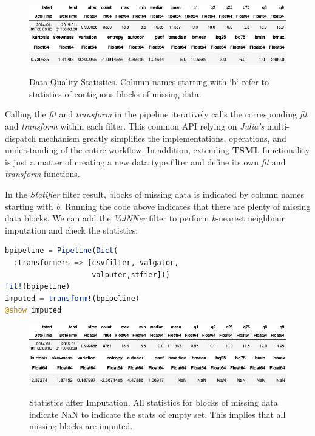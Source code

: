 \documentclass{juliacon}
\begin{document}
\begin{figure}[htbp]
   \centering
   \includegraphics[width=\columnwidth]{stat1.png} %
   \vskip 2pt
      \includegraphics[width=\columnwidth]{stat2.png} %
   \caption{Data Quality Statistics. Column names starting with `b` refer to statistics of contiguous blocks of missing data.}
   \label{fig:dataquality}
\end{figure}

Calling the \emph{fit} and \emph{transform} in the pipeline
iteratively calls the corresponding \emph{fit} and \emph{transform} within each filter. 
This common API relying on \emph{Julia's} multi-dispatch mechanism greatly simplifies the implementations, operations, 
and understanding of the entire workflow. In addition, extending \textbf{TSML} functionality is just a 
matter of creating a new data type filter and define its own  \emph{fit} and \emph{transform} 
functions.

\vskip 6pt

In the \emph{Statifier} filter result, blocks of missing data is indicated by column names starting
with \emph{b}. Running the code above indicates that there are plenty of missing data blocks.
We can add the \emph{ValNNer} filter to perform \emph{k}-nearest neighbour imputation and check
the statistics:

\begin{lstlisting}[language = Julia]
bpipeline = Pipeline(Dict(
  :transformers => [csvfilter, valgator, 
                    valputer,stfier]))
fit!(bpipeline)
imputed = transform!(bpipeline)
@show imputed
\end{lstlisting}

\begin{figure}[htbp]
   \centering
   \includegraphics[width=\columnwidth]{imputed1.png} %
   \vskip 2pt
      \includegraphics[width=\columnwidth]{imputed2.png} %
   \caption{Statistics after Imputation. All statistics for blocks of missing data indicate NaN to indicate the stats of empty set. This implies that all missing blocks are imputed.}
   \label{fig:imputation}
\end{figure}
\end{document}
